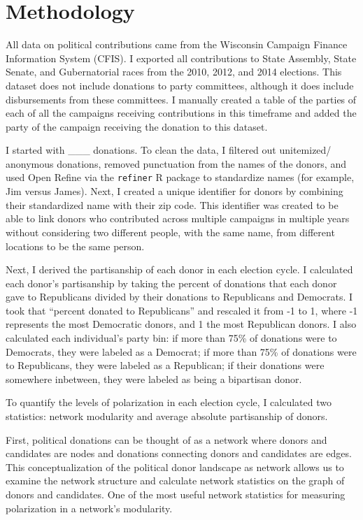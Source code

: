 \documentclass[11pt,]{article}
\begin{document}
\hypertarget{methodology}{%
\section{Methodology}\label{methodology}}

All data on political contributions came from the Wisconsin Campaign
Finance Information System (CFIS). I exported all contributions to State
Assembly, State Senate, and Gubernatorial races from the 2010, 2012, and
2014 elections. This dataset does not include donations to party
committees, although it does include disbursements from these
committees. I manually created a table of the parties of each of all the
campaigns receiving contributions in this timeframe and added the party
of the campaign receiving the donation to this dataset.

I started with \_\_\_ donations. To clean the data, I filtered out
unitemized/ anonymous donations, removed punctuation from the names of
the donors, and used Open Refine via the \texttt{refiner} R package to
standardize names (for example, Jim versus James). Next, I created a
unique identifier for donors by combining their standardized name with
their zip code. This identifier was created to be able to link donors
who contributed across multiple campaigns in multiple years without
considering two different people, with the same name, from different
locations to be the same person.

Next, I derived the partisanship of each donor in each election cycle. I
calculated each donor's partisanship by taking the percent of donations
that each donor gave to Republicans divided by their donations to
Republicans and Democrats. I took that ``percent donated to
Republicans'' and rescaled it from -1 to 1, where -1 represents the most
Democratic donors, and 1 the most Republican donors. I also calculated
each individual's party bin: if more than 75\% of donations were to
Democrats, they were labeled as a Democrat; if more than 75\% of
donations were to Republicans, they were labeled as a Republican; if
their donations were somewhere inbetween, they were labeled as being a
bipartisan donor.

To quantify the levels of polarization in each election cycle, I
calculated two statistics: network modularity and average absolute
partisanship of donors.

First, political donations can be thought of as a network where donors
and candidates are nodes and donations connecting donors and candidates
are edges. This conceptualization of the political donor landscape as
network allows us to examine the network structure and calculate network
statistics on the graph of donors and candidates. One of the most useful
network statistics for measuring polarization in a network's modularity.
\end{document}
